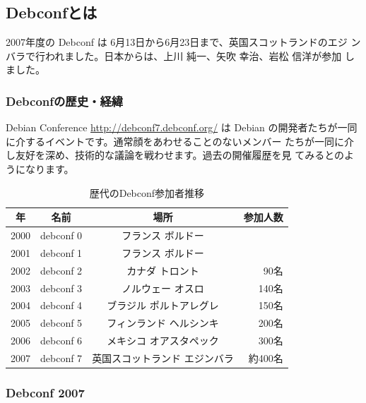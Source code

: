 \documentclass[mingoth,a4paper]{jsarticle}
\begin{document}
\label{sec:debconfreportsummary}

\subsection{Debconfとは}

  2007年度の Debconf は 6月13日から6月23日まで、英国スコットランドのエジ
ンバラで行われました。日本からは、上川 純一、矢吹 幸治、岩松 信洋が参加
しました。

\subsubsection{Debconfの歴史・経緯}

Debian Conference \url{http://debconf7.debconf.org/} は Debian 
の開発者たちが一同に介するイベントです。通常顔をあわせることのないメンバー
たちが一同に介し友好を深め、技術的な議論を戦わせます。過去の開催履歴を見
てみるとのようになります。

\begin{table}[H]
\caption{歴代のDebconf参加者推移}
\label{tab:debconflist}
 \begin{center}
 {\footnotesize
 \begin{tabular}{|c|c|c|r|}
 \hline
 年 & 名前 & 場所 & 参加人数 \\
 \hline
 2000 & debconf 0 &フランス ボルドー & \\
 2001 & debconf 1 &フランス ボルドー & \\
 2002 & debconf 2 &カナダ トロント & 90名 \\
 2003 & debconf 3 &ノルウェー オスロ & 140名 \\
 2004 & debconf 4 &ブラジル ポルトアレグレ &  150名 \\
 2005 & debconf 5 &フィンランド ヘルシンキ & 200名 \\
 2006 & debconf 6 &メキシコ オアスタペック & 300名 \\
 2007 & debconf 7 &英国スコットランド エジンバラ & 約400名 \\
 \hline
 \end{tabular}
 }
 \end{center}
\end{table}

\subsubsection{Debconf 2007}
\end{document}
